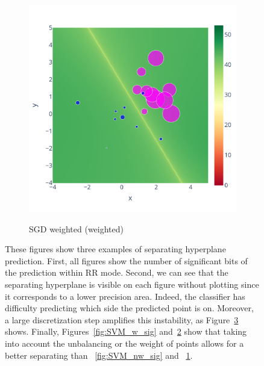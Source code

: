 \documentclass[11pt]{article}
\newcommand{\tristan}[1]{\color{orange}\textbf{From Tristan:} #1\color{black}\xspace}
\begin{document}
\begin{figure}
\begin{subfigure}{.3\linewidth}
    \label{fig:weighted_nw_sig}
    \end{subfigure}
    \begin{subfigure}{.3\linewidth}
    \caption{SGD weighted (weighted)}
    \includegraphics[width=\linewidth]{figure/Weighted/weighted.pdf}
    \label{fig:weighted_w_sig}
    \end{subfigure}
    \caption{
    These figures show three examples of separating hyperplane prediction. First, all figures show the number of significant bits of the prediction within RR mode. Second, we can see that the separating hyperplane is visible on each figure without plotting since it corresponds to a lower precision area. Indeed, the classifier has difficulty predicting which side the predicted point is on. Moreover, a large discretization step amplifies
    this instability, as Figure~\ref{fig:separating_hyperplan} shows. Finally, Figures~\ref{fig:SVM_w_sig} and~\ref{fig:weighted_w_sig} show that taking into account the unbalancing or the weight of points allows for a better separating than ~\ref{fig:SVM_nw_sig} and ~\ref{fig:weighted_nw_sig}.
    }
\label{fig:separating_hyperplan}
\end{figure}
\end{document}
